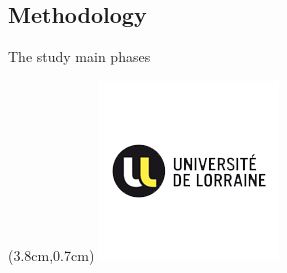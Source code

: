 \documentclass{presentation_template}
\begin{document}
\subsection{Methodology}
\begin{frame}[t]{The study main phases}\vspace{10pt}
    \begin{textblock*}{13cm}(3.8cm,0.7cm)
        \includegraphics[height = 0.6\textwidth]{univ.png}
    \end{textblock*}
\end{frame}


\breakingframe{
\begin{textblock*}{13cm}(3.5cm,4cm)
\Huge\textbf{\textcolor{black}{How to arrange stones?}}
\end{textblock*}
}
\end{document}
